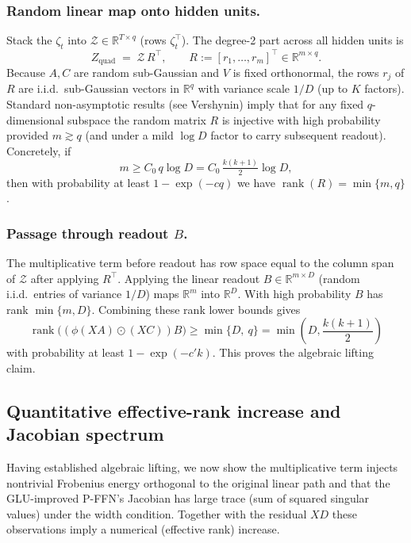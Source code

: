 \documentclass[sigconf,screen]{acmart}
\begin{document}
\subsubsection*{\bf Random linear map onto hidden units.} Stack the \(\zeta_t\) into \(\mathcal Z\in\mathbb R^{T\times q}\) (rows \(\zeta_t^\top\)). The degree-2 part across all hidden units is
\[
Z_{\mathrm{quad}} \;=\; \mathcal Z \, R^\top,
\qquad R := [r_1,\dots,r_m]^\top \in\mathbb R^{m\times q}.
\]
Because \(A,C\) are random sub-Gaussian and \(V\) is fixed orthonormal, the rows \(r_j\) of \(R\) are i.i.d.\ sub-Gaussian vectors in \(\mathbb R^q\) with variance scale \(1/D\) (up to \(K\) factors). Standard non-asymptotic results (see Vershynin) imply that for any fixed \(q\)-dimensional subspace the random matrix \(R\) is injective with high probability provided \(m\gtrsim q\) (and under a mild \(\log D\) factor to carry subsequent readout). Concretely, if
\[
m \ge C_0 \, q\log D = C_0 \, \tfrac{k(k+1)}{2}\log D,
\]
then with probability at least \(1-\exp(-c q)\) we have \(\operatorname{rank}(R)=\min\{m,q\}\).

\subsubsection*{\bf Passage through readout \(B\).} The multiplicative term before readout has row space equal to the column span of \(\mathcal Z\) after applying \(R^\top\). Applying the linear readout \(B\in\mathbb R^{m\times D}\) (random i.i.d.\ entries of variance \(1/D\)) maps \(\mathbb R^m\) into \(\mathbb R^D\). With high probability \(B\) has rank \(\min\{m,D\}\). Combining these rank lower bounds gives
\[
\operatorname{rank}\!\big((\phi(XA)\odot (XC))B\big)
\ge \min\{D,\ q\} = \min\!\left(D,\frac{k(k+1)}{2}\right)
\]
with probability at least \(1-\exp(-c' k)\). This proves the algebraic lifting claim.

\subsection{Quantitative effective-rank increase and Jacobian spectrum}
\label{app:geglu_jacobian}

Having established algebraic lifting, we now show the multiplicative term injects nontrivial Frobenius energy orthogonal to the original linear path and that the GLU-improved P-FFN's Jacobian has large trace (sum of squared singular values) under the width condition. Together with the residual \(XD\) these observations imply a numerical (effective rank) increase.
\end{document}
